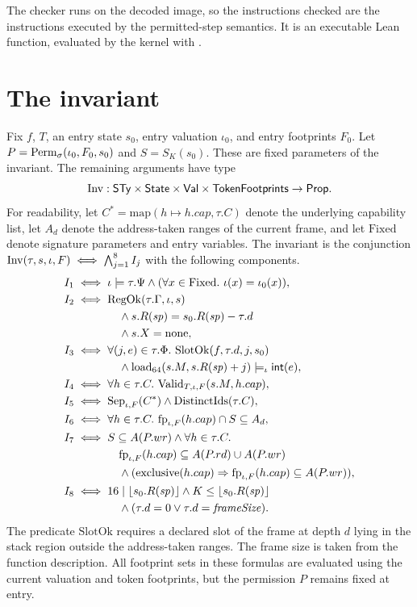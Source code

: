 The checker runs on the decoded image, so the instructions checked are the instructions executed by the permitted-step semantics. It is an executable Lean function, evaluated by the kernel with .

\section{The invariant}\label{sec:inv}
\begin{definition}\label{def:inv}
Fix $f$, $T$, an entry state $s_0$, entry valuation $\iota_0$, and entry footprints $F_0$. Let $P=\mathrm{Perm}_\sigma(\iota_0,F_0,s_0)$ and $S=S_K(s_0)$. These are fixed parameters of the invariant. The remaining arguments have type
\[\mathrm{Inv}:\mathsf{STy}\times\mathsf{State}\times\mathsf{Val}\times\mathsf{TokenFootprints}\to\mathsf{Prop}.\]
For readability, let $C^*=\mathrm{map}(h\mapsto h.cap,\tau.C)$ denote the underlying capability list, let $A_d$ denote the address-taken ranges of the current frame, and let $\mathrm{Fixed}$ denote signature parameters and entry variables. The invariant is the conjunction $\mathrm{Inv}(\tau,s,\iota,F)\iff\bigwedge_{j=1}^8 I_j$ with the following components.
\begin{align*}
I_1\iff{}&\iota\models\tau.\Psi\land(\forall x\in\mathrm{Fixed}.\ \iota(x)=\iota_0(x)),\\
I_2\iff{}&\mathrm{RegOk}(\tau.\Gamma,\iota,s)\\ &\quad\land s.R(\mathit{sp})=s_0.R(\mathit{sp})-\tau.d\\ &\quad\land s.X=\mathrm{none},\\
I_3\iff{}&\forall(j,e)\in\tau.\Phi.\ \mathrm{SlotOk}(f,\tau.d,j,s_0)\\
&\quad\land\mathrm{load}_{64}(s.M,s.R(\mathit{sp})+j)\models_\iota\inttype{e},\\
I_4\iff{}&\forall h\in\tau.C.\ \Valid_{T,\iota,F}(s.M,h.cap),\\
I_5\iff{}&\Sep_{\iota,F}(C^*)\land\mathrm{DistinctIds}(\tau.C),\\
I_6\iff{}&\forall h\in\tau.C.\ \fp_{\iota,F}(h.cap)\cap S\subseteq A_d,\\
I_7\iff{}&S\subseteq A(P.wr)\land\forall h\in\tau.C.\\
&\quad\fp_{\iota,F}(h.cap)\subseteq A(P.rd)\cup A(P.wr)\\
&\quad\land(\mathrm{exclusive}(h.cap)\Rightarrow\fp_{\iota,F}(h.cap)\subseteq A(P.wr)),\\
I_8\iff{}&16\mid\un{s_0.R(\mathit{sp})}\land K\le\un{s_0.R(\mathit{sp})}\\ &\quad\land(\tau.d=0\lor\tau.d=\mathit{frameSize}).
\end{align*}
The predicate $\mathrm{SlotOk}$ requires a declared slot of the frame at depth $d$ lying in the stack region outside the address-taken ranges. The frame size is taken from the function description. All footprint sets in these formulas are evaluated using the current valuation and token footprints, but the permission $P$ remains fixed at entry.
\end{definition}

